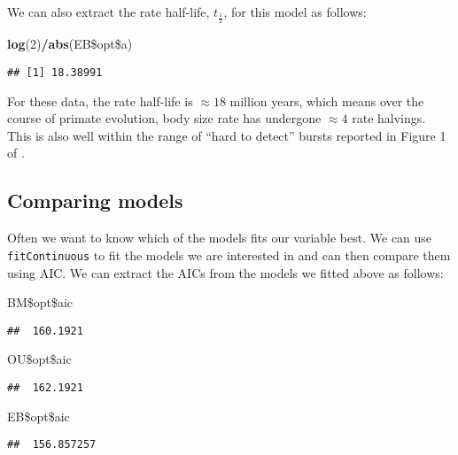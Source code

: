 \documentclass[11pt]{article}
\newcommand{\KeywordTok}[1]{\textcolor[rgb]{0.13,0.29,0.53}{\textbf{{#1}}}}
\newcommand{\DecValTok}[1]{\textcolor[rgb]{0.00,0.00,0.81}{{#1}}}
\newcommand{\NormalTok}[1]{{#1}}
\begin{document}
We can also extract the rate half-life, $t_\frac{1}{2}$, for this model as follows:

\begin{snugshade}
\begin{Highlighting}[]
\KeywordTok{log}\NormalTok{(}\DecValTok{2}\NormalTok{)}\KeywordTok{/}\KeywordTok{abs}\NormalTok{(EB\$opt\$a)}
\end{Highlighting}
\end{snugshade}

\begin{verbatim}
## [1] 18.38991
\end{verbatim}

For these data, the rate half-life is $\approx 18$ million years, which means over the course of primate evolution, body size rate has undergone $\approx 4$ rate halvings. This is also well within the range of ``hard to detect'' bursts reported in Figure 1 of \cite{Slater22102013}. 

\subsection{Comparing models}

Often we want to know which of the models fits our variable best. We can use \texttt{fitContinuous} to fit the models we are interested in and can then compare them using AIC. We can extract the AICs from the models we fitted above as follows:

\begin{snugshade}
\begin{Highlighting}[]
\NormalTok{BM\$opt\$aic}
\end{Highlighting}
\end{snugshade}
\begin{verbatim}
##  160.1921
\end{verbatim}
\begin{snugshade}
\begin{Highlighting}[]
\NormalTok{OU\$opt\$aic}
\end{Highlighting}
\end{snugshade}
\begin{verbatim}
##  162.1921
\end{verbatim}
\begin{snugshade}
\begin{Highlighting}[]
\NormalTok{EB\$opt\$aic}
\end{Highlighting}
\end{snugshade}
\begin{verbatim}
##  156.857257
\end{verbatim}
\end{document}
